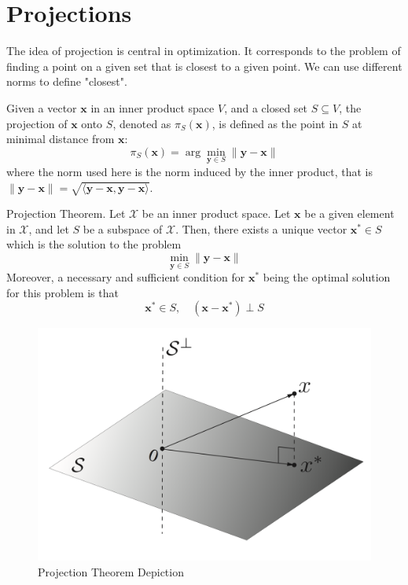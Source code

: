 \documentclass[12pt]{article}
\begin{document}
\section{Projections}
The idea of projection is central in optimization. It corresponds to the problem of finding a point on a given set that is closest to a given point. We can use different norms to define "closest". 
\begin{definition}
Given a vector $\mathbf{x}$ in an inner product space $V$, and a closed set $S\subseteq V$, the projection of $\mathbf{x}$ onto $S$, denoted as $\pi_S(\mathbf{x})$, is defined as the point in $S$ at minimal distance from $\mathbf{x}$: $$\pi_S(\mathbf{x}) = \arg\min_{\mathbf{y}\in S} \|\mathbf{y}-\mathbf{x}\|$$ where the norm used here is the norm induced by the inner product, that is $\|\mathbf{y}-\mathbf{x}\| = \sqrt{\langle \mathbf{y}-\mathbf{x}, \mathbf{y}-\mathbf{x}\rangle}$.
\end{definition}
\begin{theorem}
Projection Theorem. Let $\mathcal{X}$ be an inner product space. Let $\mathbf{x}$ be a given element in $\mathcal{X}$, and let $S$ be a subspace of $\mathcal{X}$. Then, there exists a unique vector $\mathbf{x}^*\in S$ which is the solution to the problem $$\min_{\mathbf{y}\in S} \|\mathbf{y}-\mathbf{x}\|$$ Moreover, a necessary and sufficient condition for $\mathbf{x}^*$ being the optimal solution for this problem is that $$\mathbf{x}^*\in S, \quad (\mathbf{x}-\mathbf{x}^*)\perp S$$
\end{theorem}

 \begin{figure}[h!]\begin{center}\includegraphics[scale=0.3]{figures/proj1}\caption{Projection Theorem Depiction}\end{center}\end{figure}
\end{document}

